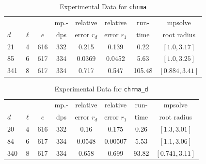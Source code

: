 \documentclass[runningheads]{llncs}
\begin{document}
\begin{table}
\caption{Experimental Data for \texttt{chrma}} %
\label{tab:chrma}
\vskip -0.15in
\begin{center}
\begin{small}
\begin{sc}
\begin{tabular}{lccccccc}
\toprule
&  &  & mp.-& relative  & relative & run- & mpsolve \\
$d$& $\ell$& $e$ & dps&error $r_d$       & error $r_1$ &time& root radius\\
\midrule
 21 & 4 & 616 & 332 & 0.215 & 0.139 & 0.22 & $[1.0, 3.17]$\\
 85 & 6 & 617 & 334 & 0.0369 & 0.0452 & 5.63 & $[1.0, 3.25]$\\
 341 & 8 & 617 & 334 & 0.717 & 0.547 & 105.48 & $[0.884, 3.41]$\\
\bottomrule
\end{tabular}
\end{sc}
\end{small}
\end{center}
\vskip 0.05in
\end{table}


\begin{table}
\caption{Experimental Data for \texttt{chrma\_d}} %
\label{tab:chrma_d}
\vskip -0.15in
\begin{center}
\begin{small}
\begin{sc}
\begin{tabular}{lccccccc}
\toprule
&  &  & mp.-& relative  & relative & run- & mpsolve \\
$d$& $\ell$& $e$ & dps&error $r_d$       & error $r_1$ &time& root radius\\
\midrule
20 & 4 & 616 & 332 & 0.16 & 0.175 & 0.26 & $[1.3, 3.01]$\\
 84 & 6 & 617 & 334 & 0.0548 & 0.00507 & 5.53 & $[1.1, 3.06]$\\
 340 & 8 & 617 & 334 & 0.658 & 0.699 & 93.82 & $[0.741, 3.11]$\\
\bottomrule
\end{tabular}
\end{sc}
\end{small}
\end{center}
\vskip 0.05in
\end{table}
\end{document}
